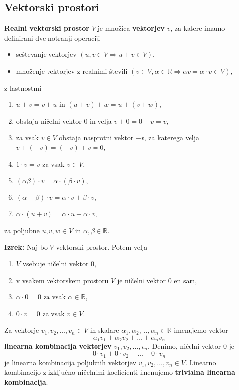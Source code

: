 \documentclass{article}
\begin{document}
\begin{multicols}{2}
\subsection{Vektorski prostori}

\textbf{Realni vektorski prostor} \( V \) je množica \textbf{vektorjev} \( v \), za katere imamo definirani dve notranji operaciji
\begin{itemize}
    \item seštevanje vektorjev \( (u, v \in V \Rightarrow u+v \in V) \),
    \item množenje vektorjev z realnimi števili \( (v \in V, \alpha \in \mathbb{R} \Rightarrow \alpha v = \alpha \cdot v \in V) \),
\end{itemize}
z lastnostmi
\begin{enumerate}
    \item \( u + v = v + u \) in \( (u + v) + w = u + (v + w) \),
    \item obstaja ničelni vektor \( 0 \) in velja \( v + 0 = 0 + v = v \),
    \item za vsak \( v \in V \) obstaja nasprotni vektor \( -v \), za katerega velja \( v + (-v) = (-v) + v = 0 \),
    \item \( 1 \cdot v = v \) za vsak \( v \in V \),
    \item \( (\alpha\beta) \cdot v = \alpha \cdot (\beta \cdot v) \),
    \item \( (\alpha + \beta) \cdot v = \alpha \cdot v + \beta \cdot v \),
    \item \( \alpha \cdot (u + v) = \alpha \cdot u + \alpha \cdot v \),
\end{enumerate}
za poljubne \( u, v, w \in V \) in \( \alpha, \beta \in \mathbb{R} \).



\textbf{Izrek:} Naj bo \( V \) vektorski prostor. Potem velja
\begin{enumerate}
    \item \( V \) vsebuje ničelni vektor \( 0 \),
    \item v vsakem vektorskem prostoru \( V \) je ničelni vektor \( 0 \) en sam,
    \item \( \alpha \cdot 0 = 0 \) za vsak \( \alpha \in \mathbb{R} \),
    \item \( 0 \cdot v = 0 \) za vsak \( v \in V \).
\end{enumerate}
Za vektorje \( v_1, v_2, \ldots, v_n \in V \) in skalare \( \alpha_1, \alpha_2, \ldots, \alpha_n \in \mathbb{R} \) imenujemo vektor
\[ \alpha_1v_1 + \alpha_2v_2 + \ldots + \alpha_nv_n \]
\textbf{linearna kombinacija vektorjev} \( v_1, v_2, \ldots, v_n \).
Denimo, ničelni vektor \( 0 \) je
\[ 0 \cdot v_1 + 0 \cdot v_2 + \ldots + 0 \cdot v_n \]
je linearna kombinacija poljubnih vektorjev \( v_1, v_2, \ldots, v_n \in V \). Linearno kombinacijo z izključno ničelnimi koeficienti imenujemo \textbf{trivialna linearna kombinacija}.


\end{multicols}
\end{document}
